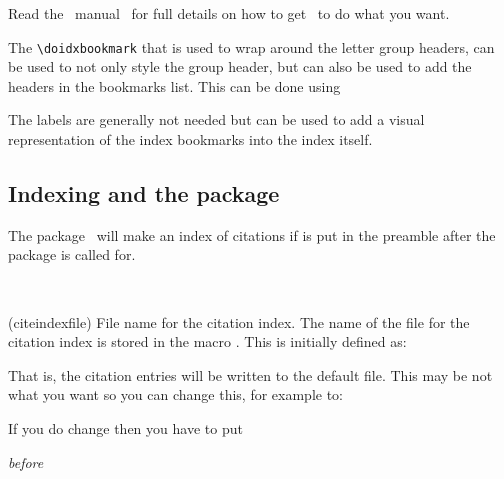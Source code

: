 %


 Read the \Lmakeindex\ manual~\cite{CHEN88} for full details
on how to get \Lmakeindex\ to do what you want.

The \verb?\doidxbookmark? that is used to wrap around the letter group
headers, can be used to not only style the group header, but can also
be used to add the headers in the bookmarks list. This can be done using
\begin{lcode}
\newcommand{\doidxbookmark}[1]{{\def\@tempa{Symbols}\def\@tempb{#1}%
  \centering\bfseries \ifx\@tempa\@tempb %
  Analphabetics 
  \phantomsection%
  \pdfbookmark[0]{Analphabetics}{Analphabetics-idx}%
  \else 
  #1%
  \phantomsection%
  \pdfbookmark[0]{#1}{#1-idx}%
  \fi%
  \vskip\onelineskip\par}}
\end{lcode}
The labels are generally not needed but can be used to add a visual
representation of the index bookmarks into the index itself.


\subsection{Indexing and the  package}

    The  package~\cite{NATBIB} will make an index 
of citations if
\cmd{\citeindextrue} is put in the preamble after the 
package is called for.

\begin{syntax}
\cmd{\citeindexfile} \\
\end{syntax}
\glossary(citeindexfile)%
  {}%
  {File name for the citation index.}
The name of the file for the citation index is stored in the
macro \cmd{\citeindexfile}. This is initially defined as:
\begin{lcode}
\newcommand{\citeindexfile}{\jobname}
\end{lcode}
That is, the citation entries will be written to the default 
 file.
This may be not what you want so you can change this, for example to:
\begin{lcode}
\renewcommand{\citeindexfile}{names}
\end{lcode}
If you do change \cmd{\citeindexfile} then you have to put
\begin{lcode}
\makeindex[\citeindexfile]
\end{lcode}
\emph{before}
\begin{lcode}
\usepackage[...]{natbib}
\end{lcode}

